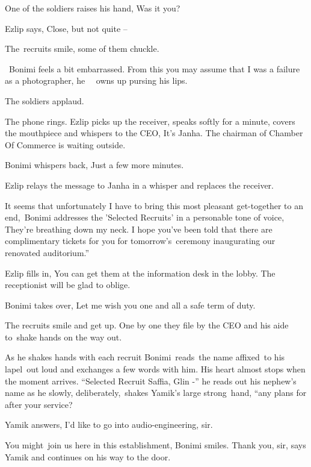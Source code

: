 \documentclass[twoside,11pt]{book}
\begin{document}
One of the soldiers raises his hand, {\textquotedbl}Was it you?{\textquotedbl} \ 

Ezlip says, {\textquotedbl}Close, but not quite --{\textquotedbl} 

The\ recruits smile, some of them chuckle{.}

~Bonimi feels a bit embarrassed. {\textquotedbl}From this you may assume that I was a failure as a
photographer,{\textquotedbl} he \ \ owns up pursing his lips. 

The soldiers applaud.~ 

The phone rings. Ezlip picks up the receiver, speaks softly for a minute, covers the mouthpiece and whispers to the CEO,
{\textquotedbl}It's Janha. The chairman of Chamber Of Commerce is waiting outside.{\textquotedbl} 

Bonimi whispers back, {\textquotedbl}Just a few more minutes.{\textquotedbl} 

Ezlip relays the message to Janha in a whisper and replaces the receiver.

{\textquotedbl}It seems that unfortunately I have to bring this most pleasant get-together to an
end,{\textquotedbl}\ Bonimi addresses the 'Selected Recruits' in a personable tone of voice, {\textquotedbl}They're
breathing down my neck. I hope you've been told that there are complimentary tickets for you for
tomorrow's{\ }ceremony inaugurating our renovated auditorium.'' 

Ezlip fills in, {\textquotedbl}You can get them at the information desk in the lobby. The receptionist will be glad to
oblige.{\textquotedbl} 

Bonimi takes over, {\textquotedbl}Let me wish you one and all a safe term of duty.{\textquotedbl}\ 

The recruits smile and get up. One by one they file by the CEO and his aide to~shake hands on the way out. 

As he shakes hands with each recruit Bonimi\ reads\ the name affixed\ to his lapel\ out loud and exchanges a few words
with him. His heart almost stops when the moment arrives. ``Selected Recruit Saffia, Glin -'' he reads out his nephew's
name as he slowly, deliberately,\ shakes Yamik's large strong{\ }hand, ``any
plans for after your service?{\textquotedbl} 

Yamik answers, {\textquotedbl}I'd like to go into audio-engineering, sir.{\textquotedbl} 

{\textquotedbl}You might\ join us here in this establishment,{\textquotedbl} Bonimi smiles. {\textquotedbl}Thank you,
sir,{\textquotedbl} says Yamik and continues on his way to the door. 
\end{document}
